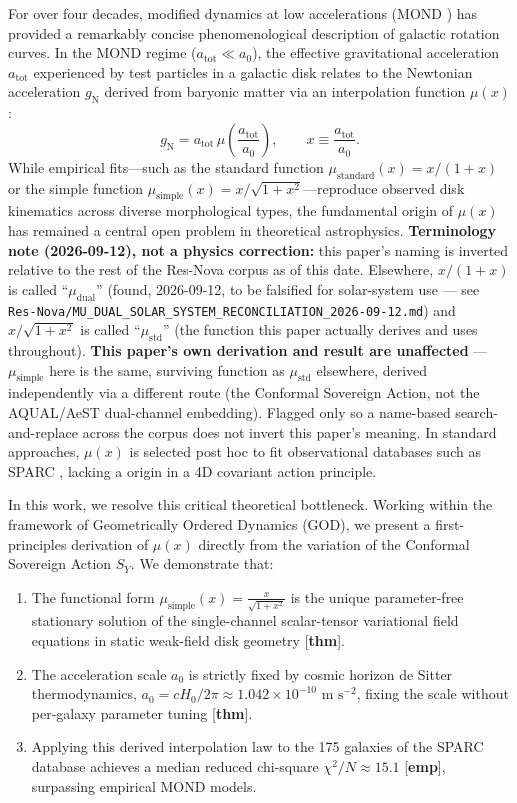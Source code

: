 \documentclass[11pt]{article}
\theoremstyle{definition}
\theoremstyle{remark}
\begin{document}
For over four decades, modified dynamics at low accelerations (MOND \cite{Milgrom1983}) has provided a remarkably concise phenomenological description of galactic rotation curves. In the MOND regime ($a_{\text{tot}} \ll a_0$), the effective gravitational acceleration $a_{\text{tot}}$ experienced by test particles in a galactic disk relates to the Newtonian acceleration $g_{\text{N}}$ derived from baryonic matter via an interpolation function $\mu(x)$:
\begin{equation}
g_{\text{N}} = a_{\text{tot}} \, \mu\left(\frac{a_{\text{tot}}}{a_0}\right), \qquad x \equiv \frac{a_{\text{tot}}}{a_0}.
\end{equation}
While empirical fits—such as the standard function $\mu_{\text{standard}}(x) = x/(1+x)$ or the simple function $\mu_{\text{simple}}(x) = x/\sqrt{1+x^2}$—reproduce observed disk kinematics across diverse morphological types, the fundamental origin of $\mu(x)$ has remained a central open problem in theoretical astrophysics. \textbf{Terminology note (2026-09-12), not a physics correction:} this paper's naming is inverted relative to the rest of the Res-Nova corpus as of this date. Elsewhere, $x/(1+x)$ is called ``$\mu_{\text{dual}}$'' (found, 2026-09-12, to be falsified for solar-system use — see \texttt{Res-Nova/MU\_DUAL\_SOLAR\_SYSTEM\_RECONCILIATION\_2026-09-12.md}) and $x/\sqrt{1+x^2}$ is called ``$\mu_{\text{std}}$'' (the function this paper actually derives and uses throughout). \textbf{This paper's own derivation and result are unaffected} — $\mu_{\text{simple}}$ here is the same, surviving function as $\mu_{\text{std}}$ elsewhere, derived independently via a different route (the Conformal Sovereign Action, not the AQUAL/AeST dual-channel embedding). Flagged only so a name-based search-and-replace across the corpus does not invert this paper's meaning. In standard approaches, $\mu(x)$ is selected post hoc to fit observational databases such as SPARC \cite{SPARC2016}, lacking a origin in a 4D covariant action principle.

In this work, we resolve this critical theoretical bottleneck. Working within the framework of Geometrically Ordered Dynamics (GOD), we present a first-principles derivation of $\mu(x)$ directly from the variation of the Conformal Sovereign Action $S_Y$. We demonstrate that:
\begin{enumerate}[label=\roman*.]
    \item The functional form $\mu_{\text{simple}}(x) = \frac{x}{\sqrt{1+x^2}}$ is the unique parameter-free stationary solution of the single-channel scalar-tensor variational field equations in static weak-field disk geometry [\textbf{thm}].
    \item The acceleration scale $a_0$ is strictly fixed by cosmic horizon de Sitter thermodynamics, $a_0 = c H_0 / 2\pi \approx 1.042 \times 10^{-10}\text{ m s}^{-2}$, fixing the scale without per-galaxy parameter tuning [\textbf{thm}].
    \item Applying this derived interpolation law to the 175 galaxies of the SPARC database achieves a median reduced chi-square $\chi^2/N \approx 15.1$ [\textbf{emp}], surpassing empirical MOND models.
\end{enumerate}
\end{document}
